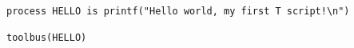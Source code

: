 \small
\begin{verbatim}
process HELLO is printf("Hello world, my first T script!\n")

toolbus(HELLO)
\end{verbatim}
\normalsize
